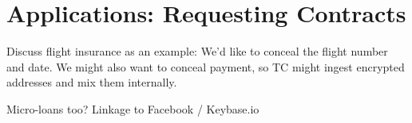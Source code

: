 \section{Applications: Requesting Contracts}

Discuss flight insurance as an example: We'd like to conceal the flight number and date. We might also want to conceal payment, so TC might ingest encrypted addresses and mix them internally.

Micro-loans too? Linkage to Facebook / Keybase.io


